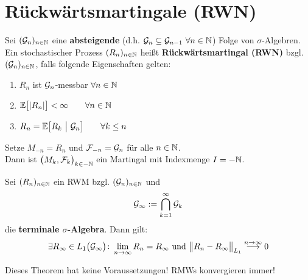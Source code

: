 \setcounter{section}{1}
\section{Rückwärtsmartingale (RWN)} %
\begin{defi}
	Sei $(\mathcal{G}_n)_{n\in\mathbb{N}}$ eine \textbf{absteigende} (d.h. $\mathcal{G}_{n}\subseteq\mathcal{G}_{n-1}~\forall n\in\mathbb{N}$) Folge von $\sigma$-Algebren.\\
	Ein stochastischer Prozess $(R_n)_{n\in\mathbb{N}}$ heißt \textbf{Rückwärtsmartingal (RWN)} bzgl. $(\mathcal{G}_n)_{n\in\mathbb{N}}$, falls folgende Eigenschaften gelten:
	\begin{enumerate}
		\item $R_n$ ist $\mathcal{G}_n$-messbar $\forall n\in\mathbb{N}$
		\item $\begin{aligned}
			\mathbb{E}\big[|R_n|\big]<\infty\qquad\forall n\in\mathbb{N}
		\end{aligned}$
		\item $\begin{aligned}
			R_n=\mathbb{E}\big[R_k~\big|~\mathcal{G}_n\big]\qquad\forall k\leq n
		\end{aligned}$
	\end{enumerate} 
\end{defi}

\begin{bemerkung}
	Setze $M_{-n}=R_n$  und $\mathcal{F}_{-n}=\mathcal{G}_n$ für alle $n\in\mathbb{N}$.\\
	Dann ist $\big(M_k,\mathcal{F}_k\big)_{k\in-\mathbb{N}}$ ein Martingal mit Indexmenge $I=-\mathbb{N}$.
\end{bemerkung}

\begin{theorem}\label{theorem5.5KonvergenzVonRWMs}\enter
	Sei $(R_n)_{n\in\mathbb{N}}$ ein RWM bzgl. $(\mathcal{G}_n)_{n\in\mathbb{N}}$ und 
	\begin{align*}
		\mathcal{G}_\infty:=\bigcap\limits_{k=1}^\infty\mathcal{G}_k
	\end{align*}
	die \textbf{terminale $\sigma$-Algebra}. Dann gilt:
	\begin{align*}
		\exists R_\infty\in L_1\big(\mathcal{G}_\infty\big)\colon\lim\limits_{n\to\infty} R_n=R_\infty \text{ und } \big\Vert R_n-R_\infty\big\Vert_{L_1}\stackrel{n\to\infty}{\longrightarrow}0
	\end{align*}
\end{theorem}

\begin{bemerkung}
	Dieses Theorem hat keine Voraussetzungen! RMWs konvergieren immer!
\end{bemerkung}

